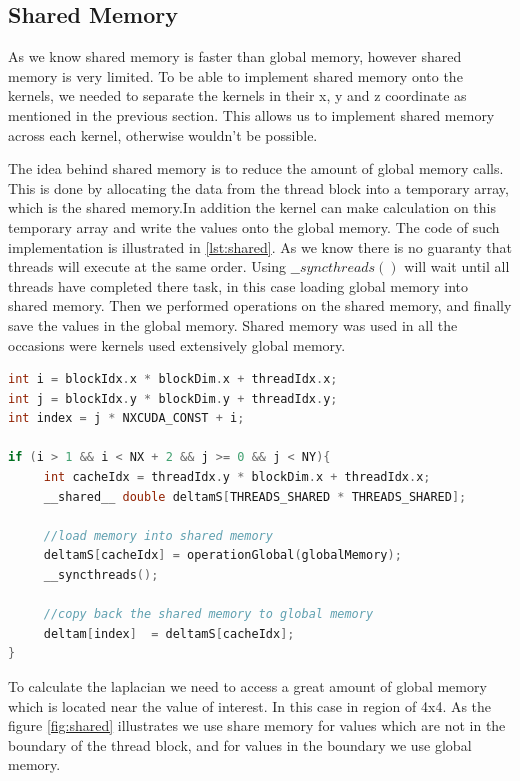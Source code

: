 \subsection{Shared Memory}

As we know shared memory is faster than global memory, however shared memory is very limited. To be able to implement shared memory onto the kernels, we needed to separate the kernels in their x, y and z coordinate as mentioned in the previous section. This allows us to implement shared memory across each kernel, otherwise wouldn't be possible.

The idea behind shared memory is to reduce the amount of global memory calls. This is done by allocating the data from the thread block into a temporary array, which is the shared memory.In addition the kernel can make calculation on this temporary array and write the values onto the global memory. The code of such implementation is illustrated in \ref{lst:shared}. As we know there is no guaranty that threads will execute at the same order. Using $\_\_syncthreads()$ will wait until all threads have completed there task, in this case loading global memory into shared memory. Then we performed operations on the shared memory, and finally save the values in the global memory. Shared memory was used in all the occasions were kernels used extensively global memory.

\begin{lstlisting}[language=C++, label={lst:shared}, caption={Shared memory}]
int i = blockIdx.x * blockDim.x + threadIdx.x;
int j = blockIdx.y * blockDim.y + threadIdx.y;
int index = j * NXCUDA_CONST + i;

if (i > 1 && i < NX + 2 && j >= 0 && j < NY){
     int cacheIdx = threadIdx.y * blockDim.x + threadIdx.x;
     __shared__ double deltamS[THREADS_SHARED * THREADS_SHARED];

	 //load memory into shared memory
     deltamS[cacheIdx] = operationGlobal(globalMemory);
     __syncthreads();

	 //copy back the shared memory to global memory
     deltam[index]  = deltamS[cacheIdx];
}
\end{lstlisting}

To calculate the laplacian we need to access a great amount of global memory which is located near the value of interest. In this case in region of 4x4. As the figure \ref{fig:shared} illustrates we use share memory for values which are not in the boundary of the thread block, and for values in the boundary we use global memory.

